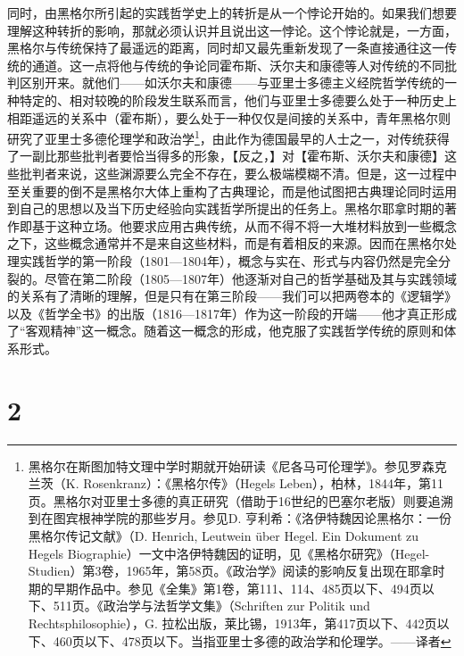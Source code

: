 同时，由黑格尔所引起的实践哲学史上的转折是从一个悖论开始的。如果我们想要理解这种转折的影响，那就必须认识并且说出这一悖论。这个悖论就是，一方面，黑格尔与传统保持了最遥远的距离，同时却又最先重新发现了一条直接通往这一传统的通道。这一点将他与传统的争论同霍布斯、沃尔夫和康德等人对传统的不同批判区别开来。就他们——如沃尔夫和康德——与亚里士多德主义经院哲学传统的一种特定的、相对较晚的阶段发生联系而言，他们与亚里士多德要么处于一种历史上相距遥远的关系中（霍布斯），要么处于一种仅仅是间接的关系中，青年黑格尔则研究了亚里士多德伦理学和政治学\footnote{黑格尔在斯图加特文理中学时期就开始研读《尼各马可伦理学》。参见罗森克兰茨（K. Rosenkranz）：《黑格尔传》（Hegels Leben），柏林，1844年，第11页。黑格尔对亚里士多德的真正研究（借助于16世纪的巴塞尔老版）则要追溯到在图宾根神学院的那些岁月。参见D. 亨利希：《洛伊特魏因论黑格尔：一份黑格尔传记文献》（D. Henrich, Leutwein über Hegel. Ein Dokument zu Hegels Biographie）一文中洛伊特魏因的证明，见《黑格尔研究》（Hegel-Studien）第3卷，1965年，第58页。《政治学》阅读的影响反复出现在耶拿时期的早期作品中。参见《全集》第1卷，第111、114、485页以下、494页以下、511页。《政治学与法哲学文集》（Schriften zur Politik und Rechtsphilosophie），G. 拉松出版，莱比锡，1913年，第417页以下、442页以下、460页以下、478页以下。当指亚里士多德的政治学和伦理学。——译者}，由此作为德国最早的人士之一，对传统获得了一副比那些批判者要恰当得多的形象，【反之，】对【霍布斯、沃尔夫和康德】这些批判者来说，这些渊源要么完全不存在，要么极端模糊不清。但是，这一过程中至关重要的倒不是黑格尔大体上重构了古典理论，而是他试图把古典理论同时运用到自己的思想以及当下历史经验向实践哲学所提出的任务上。黑格尔耶拿时期的著作即基于这种立场。他要求应用古典传统，从而不得不将一大堆材料放到一些概念之下，这些概念通常并不是来自这些材料，而是有着相反的来源。因而在黑格尔处理实践哲学的第一阶段（1801—1804年），概念与实在、形式与内容仍然是完全分裂的。尽管在第二阶段（1805—1807年）他逐渐对自己的哲学基础及其与实践领域的关系有了清晰的理解，但是只有在第三阶段——我们可以把两卷本的《逻辑学》以及《哲学全书》的出版（1816—1817年）作为这一阶段的开端——他才真正形成了“客观精神”这一概念。随着这一概念的形成，他克服了实践哲学传统的原则和体系形式。

\section*{2}


